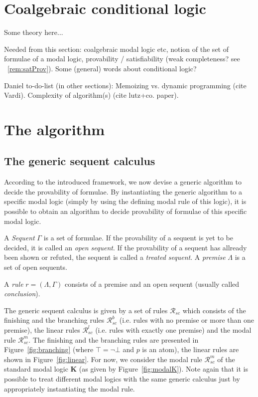 \documentclass{entcs} \usepackage{entcsmacro}
\begin{document}
\section{Coalgebraic conditional logic}

Some theory here...

Needed from this section: coalgebraic modal logic etc, notion of the set of
formulae of a modal logic, provability / satisfiability (weak completeness?
see ~\ref{rem:satProv}).
Some (general) words about conditional logic?

Daniel to-do-list (in other sections): Memoizing vs. dynamic programming (cite Vardi).
Complexity of algorithm(s) (cite lutz+co. paper).

\section{The algorithm}

\subsection{The generic sequent calculus}

According to the introduced framework, we now devise a generic
algorithm to decide the provability of formulae. By
instantiating the generic algorithm to a specific modal logic
(simply by using the defining modal rule of this logic), it is
possible to obtain an algorithm to decide provability of
formulae of this specific modal logic.

\begin{definition}
A \emph{Sequent} $\Gamma$ is a set of formulae. If the provability
of a sequent is yet to be decided, it is called an \emph{open sequent}.
If the provability of a sequent has allready been shown or refuted,
the sequent is called a \emph{treated sequent}. A \emph{premise}
$\Lambda$ is a set of open sequents.
\end{definition}

\begin{definition}
\noindent A \emph{rule} $r=(\Lambda,\Gamma)$ consists of a premise
and an open sequent (usually called \emph{conclusion}).
\end{definition}
\noindent The generic sequent calculus is given by a set of rules
$\mathcal{R}_{sc}$ which consists of the finishing and the branching
rules $\mathcal{R}^b_{sc}$ (i.e. rules with no premise or more than
one premise), the linear rules $\mathcal{R}^l_{sc}$ (i.e. rules with
exactly one premise) and the modal rule $\mathcal R^m_{sc}$. The
finishing and the branching rules are presented in Figure~\ref{fig:branching}
(where $\top=\neg\bot$ and $p$ is an atom), the
linear rules are shown in Figure~\ref{fig:linear}. For now, we consider the modal
rule $\mathcal R^m_{sc}$ of the standard modal logic \textbf{K}
(as given by Figure~\ref{fig:modalK}). Note again that
it is possible to treat different modal logics with the same generic
calculus just by appropriately instantiating the modal rule.
\end{document}
